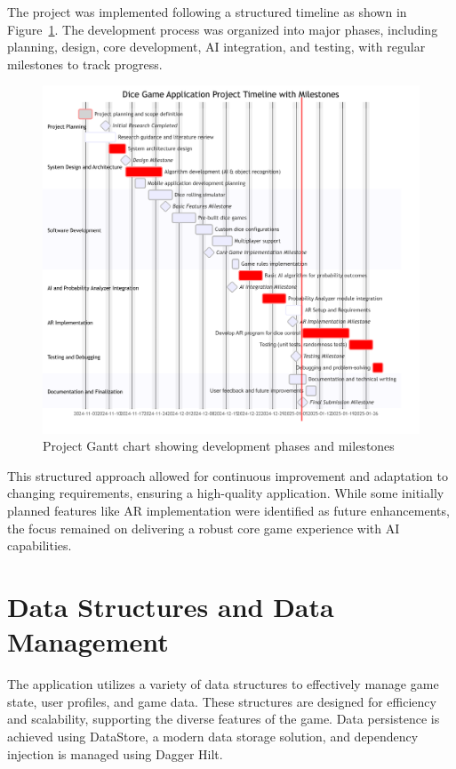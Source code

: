 The project was implemented following a structured timeline as shown in Figure~\ref{fig:gantt}. The development process was organized into major phases, including planning, design, core development, AI integration, and testing, with regular milestones to track progress.

\begin{figure}[h]
    \centering
    \includegraphics[width=\textwidth]{img/gantt_chart.png}
    \caption{Project Gantt chart showing development phases and milestones}
    \label{fig:gantt}
\end{figure}

This structured approach allowed for continuous improvement and adaptation to changing requirements, ensuring a high-quality application. While some initially planned features like AR implementation were identified as future enhancements, the focus remained on delivering a robust core game experience with AI capabilities.

\section{Data Structures and Data Management}

The application utilizes a variety of data structures to effectively manage game state, user profiles, and game data. These structures are designed for efficiency and scalability, supporting the diverse features of the game. Data persistence is achieved using DataStore, a modern data storage solution, and dependency injection is managed using Dagger Hilt.

